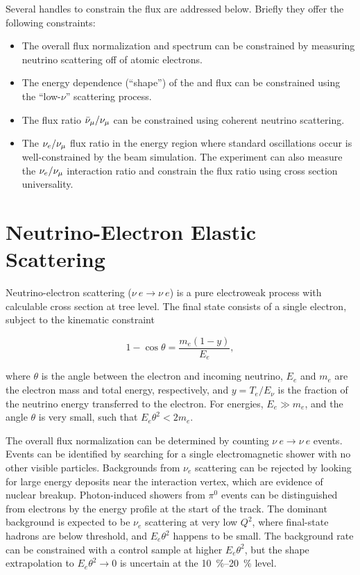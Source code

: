 Several handles to constrain the flux %
are addressed below. Briefly they offer the following constraints:

\begin{itemize}
    \item The overall flux normalization and spectrum can be constrained by measuring neutrino scattering off of atomic electrons.
    \item The energy dependence (``shape'') of the \numu and \anumu %
     flux can be constrained using the ``low-$\nu$'' scattering process.
    \item The flux ratio $\bar\nu_\mu/\nu_\mu$ can be constrained using  coherent neutrino scattering.
    \item The $\nu_e/\nu_\mu$ flux ratio in the energy region where standard oscillations occur is well-constrained by the beam simulation. The experiment can also measure the $\nu_e/\nu_\mu$ interaction ratio and constrain the flux ratio using cross section universality.
\end{itemize}





\section{Neutrino-Electron Elastic Scattering}
\label{sec:appx-nd:fluxintro-e-nu-scatt}



Neutrino-electron scattering ($\nu \ e \rightarrow \nu \ e$) is a pure electroweak process with calculable cross section at tree level. The final state consists of a single electron, subject to the kinematic constraint 

\begin{equation}
1 - \cos \theta = \frac{m_{e}(1-y)}{E_{e}},
\end{equation}

where $\theta$ is the angle between the electron and incoming neutrino, $E_{e}$ and $m_{e}$ are the electron mass and total energy, respectively, and $y = T_{e}/E_{\nu}$ is the fraction of the neutrino energy transferred to the electron. For  energies, $E_{e} \gg m_{e}$, and the angle $\theta$ is very small, such that $E_{e}\theta^{2} < 2m_{e}$. 

The overall flux normalization can be determined by counting $\nu \ e \rightarrow \nu \ e$ events. Events can be identified by searching for a single electromagnetic shower with no other visible particles. Backgrounds from $\nu_{e}$  scattering can be rejected by looking for large energy deposits near the interaction vertex, which are evidence of nuclear breakup. Photon-induced showers from  $\pi^{0}$ events can be distinguished from electrons by the energy profile at the start of the track. The dominant background is expected to be $\nu_{e}$  scattering at very low $Q^{2}$, where final-state hadrons are below threshold, and $E_{e}\theta^{2}$ happens to be small. The background rate can be constrained with a control sample at higher $E_{e}\theta^{2}$, but the shape extrapolation to $E_{e}\theta^{2} \rightarrow 0$ is uncertain at the \SIrange{10}{20}{\%} level.

